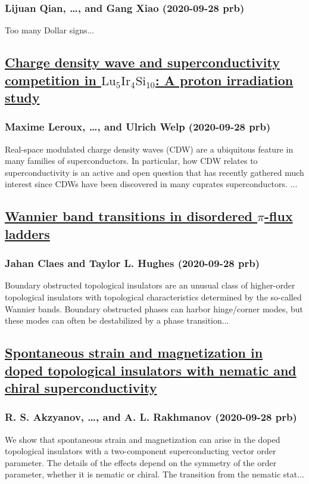 \subsubsection*{Lijuan Qian, \dots, and Gang Xiao (2020-09-28 prb)}
Too many Dollar signs...
\subsection*{\href{http://link.aps.org/doi/10.1103/PhysRevB.102.094519}{Charge density wave and superconductivity competition in ${\mathrm{Lu}}_{5}{\mathrm{Ir}}_{4}{\mathrm{Si}}_{10}$: A proton irradiation study}}
\subsubsection*{Maxime Leroux, \dots, and Ulrich Welp (2020-09-28 prb)}
Real-space modulated charge density waves (CDW) are a ubiquitous feature in many families of superconductors. In particular, how CDW relates to superconductivity is an active and open question that has recently gathered much interest since CDWs have been discovered in many cuprates superconductors. ...
\subsection*{\href{http://link.aps.org/doi/10.1103/PhysRevB.102.100203}{Wannier band transitions in disordered $π$-flux ladders}}
\subsubsection*{Jahan Claes and Taylor L. Hughes (2020-09-28 prb)}
Boundary obstructed topological insulators are an unusual class of higher-order topological insulators with topological characteristics determined by the so-called Wannier bands. Boundary obstructed phases can harbor hinge/corner modes, but these modes can often be destabilized by a phase transition...
\subsection*{\href{http://link.aps.org/doi/10.1103/PhysRevB.102.100505}{Spontaneous strain and magnetization in doped topological insulators with nematic and chiral superconductivity}}
\subsubsection*{R. S. Akzyanov, \dots, and A. L. Rakhmanov (2020-09-28 prb)}
We show that spontaneous strain and magnetization can arise in the doped topological insulators with a two-component superconducting vector order parameter. The details of the effects depend on the symmetry of the order parameter, whether it is nematic or chiral. The transition from the nematic stat...
